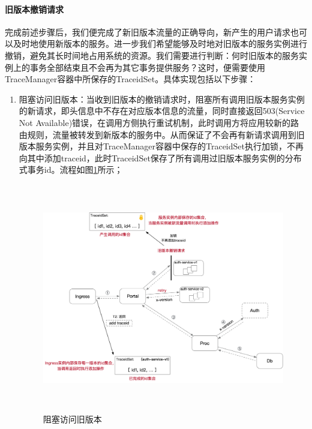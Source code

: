 \documentclass[a4paper, 12pt]{article}
\theoremstyle{definition}
\begin{document}
\paragraph{旧版本撤销请求}
完成前述步骤后，我们便完成了新旧版本流量的正确导向，新产生的用户请求也可以及时地使用新版本的服务。进一步我们希望能够及时地对旧版本的服务实例进行撤销，避免其长时间地占用系统的资源。我们需要进行判断：何时旧版本的服务实例上的事务全部结束且不会再为其它事务提供服务？这时，便需要使用TraceManager容器中所保存的TraceidSet。具体实现包括以下步骤：
\begin{enumerate}
	\item 阻塞访问旧版本：当收到旧版本的撤销请求时，阻塞所有调用旧版本服务实例的新请求，即头信息中不存在对应版本信息的流量，同时直接返回503(Service Not Available)错误，在调用方侧执行重试机制，此时调用方将应用较新的路由规则，流量被转发到新版本的服务中。从而保证了不会再有新请求调用到旧版本服务实例，并且对TraceManager容器中保存的TraceidSet执行加锁，不再向其中添加traceid，此时TraceidSet保存了所有调用过旧版本服务实例的分布式事务id。流程如图\ref{fig:block_and_retry}所示；
	\begin{figure}[ht]
	 \centering
	 \includegraphics[height=10cm]{images/block_and_retry.png}
	 \caption{阻塞访问旧版本}
	 \label{fig:block_and_retry}
	\end{figure}


\end{enumerate}
\end{document}
